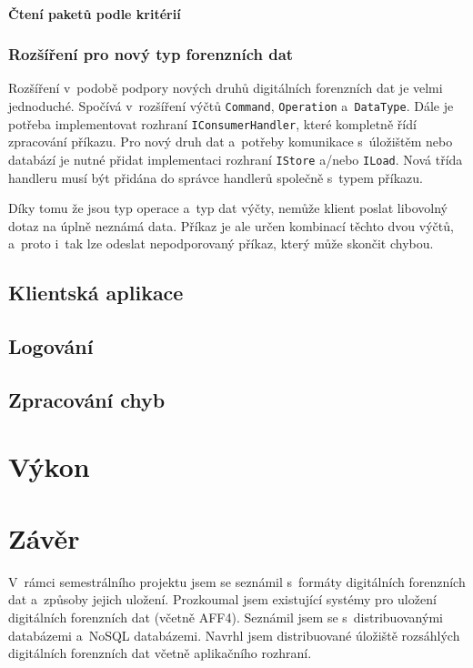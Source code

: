 \subsubsection{Čtení paketů podle kritérií}

\subsection{Rozšíření pro nový typ forenzních dat}
Rozšíření v~podobě podpory nových druhů digitálních forenzních dat je velmi jednoduché. Spočívá v~rozšíření výčtů \texttt{Command}, \texttt{Operation} a~\texttt{DataType}. Dále je potřeba implementovat rozhraní \texttt{IConsumerHandler}, které kompletně řídí zpracování příkazu.
Pro nový druh dat a~potřeby komunikace s~úložištěm nebo databází je nutné přidat implementaci rozhraní \texttt{IStore} a/nebo \texttt{ILoad}.
Nová třída handleru musí být přidána do správce handlerů společně s~typem příkazu.

Díky tomu že jsou typ operace a~typ dat výčty, nemůže klient poslat libovolný dotaz na úplně neznámá data. Příkaz je ale určen kombinací těchto dvou výčtů, a~proto i~tak lze odeslat nepodporovaný příkaz, který může skončit chybou.

\section{Klientská aplikace}

\section{Logování}

\section{Zpracování chyb}

\chapter{Výkon} \label{chapter_performance}

\chapter{Závěr}
V~rámci semestrálního projektu jsem se seznámil s~formáty digitálních forenzních dat a~způsoby jejich uložení. Prozkoumal jsem existující systémy pro uložení digitálních forenzních dat (včetně AFF4). Seznámil jsem se s~distribuovanými databázemi a~NoSQL databázemi. Navrhl jsem distribuované úložiště rozsáhlých digitálních forenzních dat včetně aplikačního rozhraní.

